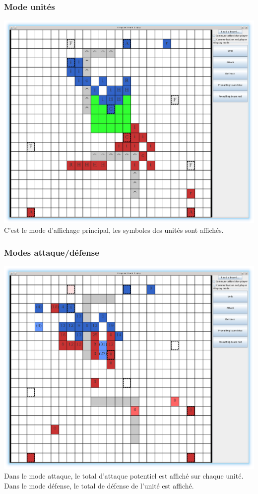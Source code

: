 \documentclass[12pt]{article}
\begin{document}
			\subsubsection{ Mode unités}
			\includegraphics[scale=0.4]{images/screen1.eps}
			C'est le mode d'affichage principal, les symboles des unités sont affichés.

			\clearpage

			\subsubsection{ Modes attaque/défense}
			\includegraphics[scale=0.4]{images/screen2.eps}
			Dans le mode attaque, le total d'attaque potentiel est affiché sur chaque unité.
			Dans le mode défense, le total de défense de l'unité est affiché.
		
\end{document}
